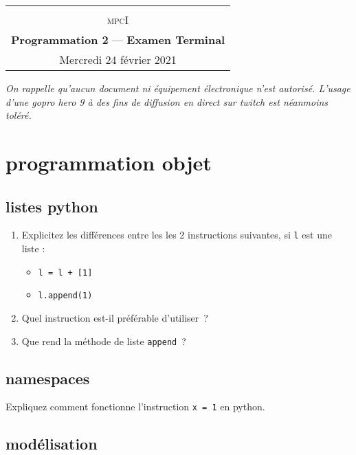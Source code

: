 \documentclass
[12pt]
{article}
\begin{document}
\begin{center}
  \begin{tabular}{c}
  \hline\\%
  {\textsc{mpc\large{I}}}\vspace{0.1cm}
  \\
%  
    {\bf {\Large Programmation 2}} — {\bf  { Examen Terminal}}\\
    {\footnotesize Mercredi 24 février 2021}\\
    \hline
  \end{tabular}
\end{center}
\vspace{0.6cm}
%
%
\begin{center}
{\em On rappelle qu'aucun document ni équipement électronique n'est autorisé. L'usage d'une gopro hero 9 à des fins de diffusion en direct sur twitch est néanmoins toléré. }
\end{center}
\section{programmation objet}

\subsection{listes python}

\begin{enumerate}
  \item
Explicitez les différences entre les les 2 instructions suivantes, si {\tt l} est une liste :
\begin{itemize}
  \item {\tt l = l + [1]}
  \item {\tt l.append(1)}
\end{itemize}
\item Quel instruction est-il préférable  d'utiliser~? 
\item Que rend la méthode de liste {\tt append}~?
\end{enumerate}

\subsection{namespaces}
Expliquez comment fonctionne l'instruction {\tt x = 1} en python.

\subsection{modélisation}
\end{document}
